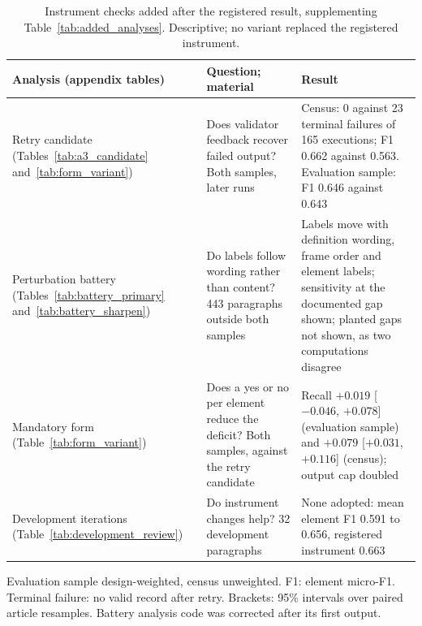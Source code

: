 \begin{table}[htbp]
\centering
\scriptsize
\setlength{\tabcolsep}{3pt}
\begin{threeparttable}
\caption[Instrument checks added after the registered result]{Instrument checks added after the registered result, supplementing Table~\ref{tab:added_analyses}. Descriptive; no variant replaced the registered instrument.}
\label{tab:instrument_checks}
\begin{tabular}{@{}>{\raggedright\arraybackslash}p{36mm}>{\raggedright\arraybackslash}p{50mm}>{\raggedright\arraybackslash}p{65mm}@{}}
\toprule
\textbf{Analysis (appendix tables)} & \textbf{Question; material} & \textbf{Result} \\
\midrule
Retry candidate (Tables~\ref{tab:a3_candidate} and~\ref{tab:form_variant}) & Does validator feedback recover failed output? Both samples, later runs & Census: 0 against 23 terminal failures of 165 executions; F1 0.662 against 0.563. Evaluation sample: F1 0.646 against 0.643 \\
Perturbation battery (Tables~\ref{tab:battery_primary} and~\ref{tab:battery_sharpen}) & Do labels follow wording rather than content? 443 paragraphs outside both samples & Labels move with definition wording, frame order and element labels; sensitivity at the documented gap shown; planted gaps not shown, as two computations disagree \\
Mandatory form (Table~\ref{tab:form_variant}) & Does a yes or no per element reduce the deficit? Both samples, against the retry candidate & Recall $+0.019$ [$-0.046$, $+0.078$] (evaluation sample) and $+0.079$ [$+0.031$, $+0.116$] (census); output cap doubled \\
Development iterations (Table~\ref{tab:development_review}) & Do instrument changes help? 32 development paragraphs & None adopted: mean element F1 0.591 to 0.656, registered instrument 0.663 \\
\bottomrule
\end{tabular}
\begin{tablenotes}\footnotesize
\item Evaluation sample design-weighted, census unweighted. F1: element micro-F1. Terminal failure: no valid record after retry. Brackets: 95\% intervals over paired article resamples. Battery analysis code was corrected after its first output.
\end{tablenotes}
\end{threeparttable}
\end{table}
